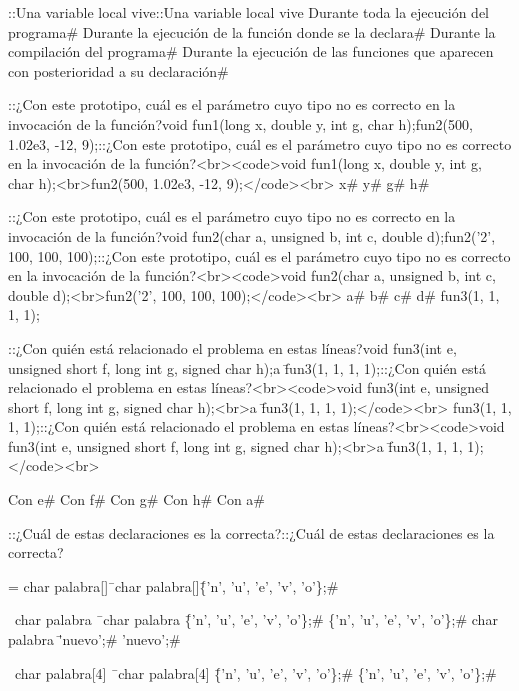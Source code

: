 {{{{{{{{{{{{{{\question ::Una variable local vive::Una variable local vive
\choice Durante toda la ejecución del programa# 
\correctchoice Durante la ejecución de la función donde se la declara# 
\choice Durante la compilación del programa# 
\choice Durante la ejecución de las funciones que aparecen con posterioridad a su declaración# 

\question ::¿Con este prototipo, cuál es el parámetro cuyo tipo no es correcto en la invocación de la función?void fun1(long x, double y, int g, char h);fun2(500, 1.02e3, -12, 9);::¿Con este prototipo, cuál es el parámetro cuyo tipo no es correcto en la invocación de la función?<br><code>void fun1(long x, double y, int g, char h);<br>fun2(500, 1.02e3, -12, 9);</code><br>
\correctchoice x# 
\choice y# 
\choice g# 
\choice h# 

\question ::¿Con este prototipo, cuál es el parámetro cuyo tipo no es correcto en la invocación de la función?void fun2(char a, unsigned b, int c, double d);fun2('2', 100, 100, 100);::¿Con este prototipo, cuál es el parámetro cuyo tipo no es correcto en la invocación de la función?<br><code>void fun2(char a, unsigned b, int c, double d);<br>fun2('2', 100, 100, 100);</code><br>
\choice a# 
\choice b# 
\choice c# 
\correctchoice d# 
\correctchoice fun3(1, 1, 1, 1); 

\question ::¿Con quién está relacionado el problema en estas líneas?void fun3(int e, unsigned short f, long int g, signed char h);a \= fun3(1, 1, 1, 1);::¿Con quién está relacionado el problema en estas líneas?<br><code>void fun3(int e, unsigned short f, long int g, signed char h);<br>a \= fun3(1, 1, 1, 1);</code><br>
\correctchoice fun3(1, 1, 1, 1);::¿Con quién está relacionado el problema en estas líneas?<br><code>void fun3(int e, unsigned short f, long int g, signed char h);<br>a \= fun3(1, 1, 1, 1);</code><br>{
\choice Con e# 
\choice Con f# 
\choice Con g# 
\choice Con h# 
\correctchoice Con a# 

\question ::¿Cuál de estas declaraciones es la correcta?::¿Cuál de estas declaraciones es la correcta?

\question 	= char palabra[]\=\
\correctchoice char palabra[]\=\{'n', 'u', 'e', 'v', 'o'\};# 

\question 	~char palabra \= \
\choice char palabra \= \{'n', 'u', 'e', 'v', 'o'\};# 
\correctchoice \{'n', 'u', 'e', 'v', 'o'\};# 
\choice char palabra \= 'nuevo';# 
\correctchoice 'nuevo';# 

\question 	~char palabra[4] \= \
\choice char palabra[4] \= \{'n', 'u', 'e', 'v', 'o'\};# 
\correctchoice \{'n', 'u', 'e', 'v', 'o'\};# 

}}}}}}}}}}}}}}}
